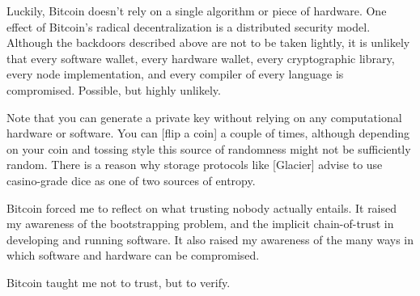 
Luckily, Bitcoin doesn't rely on a single algorithm or piece of
hardware. One effect of Bitcoin's radical decentralization is a
distributed security model. Although the backdoors described above are
not to be taken lightly, it is unlikely that every software wallet,
every hardware wallet, every cryptographic library, every node
implementation, and every compiler of every language is compromised.
Possible, but highly unlikely.

Note that you can generate a private key without relying on any
computational hardware or software. You can [flip a coin] a couple of
times, although depending on your coin and tossing style this source of
randomness might not be sufficiently random. There is a reason why
storage protocols like [Glacier] advise to use casino-grade dice as one
of two sources of entropy.

Bitcoin forced me to reflect on what trusting nobody actually entails.
It raised my awareness of the bootstrapping problem, and the implicit
chain-of-trust in developing and running software. It also raised my
awareness of the many ways in which software and hardware can be
compromised.

Bitcoin taught me not to trust, but to verify.

%
%
%
%
